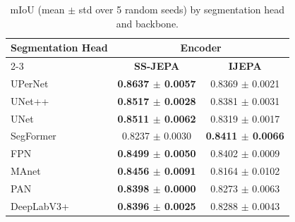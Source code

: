 \begin{table}
	\centering
	\scriptsize{}
	\caption{mIoU (mean $\pm$ std over 5 random seeds) by segmentation head and backbone.}
	\label{tab:decoder-comparison}
	\vspace{-1em}
	\begin{tabular}{lcc}
		\toprule
		\multirow{2}{*}{\textbf{Segmentation Head}} & \multicolumn{2}{c}{\textbf{Encoder}}                                \\
		\cmidrule(lr){2-3}
		                                            & \textbf{SS-JEPA}                     & \textbf{IJEPA}               \\
		\midrule
		UPerNet                                     & \textbf{0.8637 $\pm$ 0.0057}         & 0.8369 $\pm$ 0.0021          \\
		UNet++                                      & \textbf{0.8517 $\pm$ 0.0028}         & 0.8381 $\pm$ 0.0031          \\
		UNet                                        & \textbf{0.8511 $\pm$ 0.0062}         & 0.8319 $\pm$ 0.0017          \\
		SegFormer                                   & 0.8237 $\pm$ 0.0030                  & \textbf{0.8411 $\pm$ 0.0066} \\
		FPN                                         & \textbf{0.8499 $\pm$ 0.0050}         & 0.8402 $\pm$ 0.0009          \\
		MAnet                                       & \textbf{0.8456 $\pm$ 0.0091}         & 0.8164 $\pm$ 0.0102          \\
		PAN                                         & \textbf{0.8398 $\pm$ 0.0000}         & 0.8273 $\pm$ 0.0063          \\
		DeepLabV3+                                  & \textbf{0.8396 $\pm$ 0.0025}         & 0.8288 $\pm$ 0.0043          \\
		\bottomrule
	\end{tabular}
\end{table}
